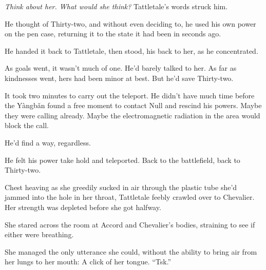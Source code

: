 \emph{Think about her.  What would she think?}  Tattletale's words struck him.



He thought of Thirty-two, and without even deciding to, he used his own power on the pen case, returning it to the state it had been in seconds ago.



He handed it back to Tattletale, then stood, his back to her, as he concentrated.



As goals went, it wasn't much of one.  He'd barely talked to her.  As far as kindnesses went, hers had been minor at best.  But he'd save Thirty-two.



It took two minutes to carry out the teleport.  He didn't have much time before the Y\`{a}ngb\v{a}n found a free moment to contact Null and rescind his powers.  Maybe they were calling already.  Maybe the electromagnetic radiation in the area would block the call.



He'd find a way, regardless.



He felt his power take hold and teleported.  Back to the battlefield, back to Thirty-two.



Chest heaving as she greedily sucked in air through the plastic tube she'd jammed into the hole in her throat, Tattletale feebly crawled over to Chevalier.  Her strength was depleted before she got halfway.



She stared across the room at Accord and Chevalier's bodies, straining to see if either were breathing.



She managed the only utterance she could, without the ability to bring air from her lungs to her mouth:  A click of her tongue.  ``Tsk.''





